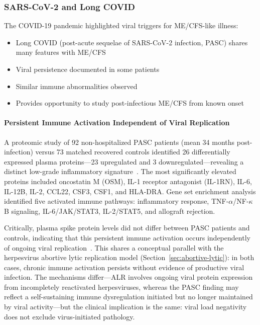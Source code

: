 \subsubsection{SARS-CoV-2 and Long COVID}

The COVID-19 pandemic highlighted viral triggers for ME/CFS-like illness:
\begin{itemize}
    \item Long COVID (post-acute sequelae of SARS-CoV-2 infection, PASC) shares many features with ME/CFS
    \item Viral persistence documented in some patients
    \item Similar immune abnormalities observed
    \item Provides opportunity to study post-infectious ME/CFS from known onset
\end{itemize}

\paragraph{Persistent Immune Activation Independent of Viral Replication}
A proteomic study of 92 non-hospitalized PASC patients (mean 34 months post-infection) versus 73 matched recovered controls identified 26 differentially expressed plasma proteins---23 upregulated and 3 downregulated---revealing a distinct low-grade inflammatory signature~\cite{Fineschi2026pasc_proteomics}. The most significantly elevated proteins included oncostatin M (OSM), IL-1 receptor antagonist (IL-1RN), IL-6, IL-12B, IL-2, CCL22, CSF3, CSF1, and HLA-DRA. Gene set enrichment analysis identified five activated immune pathways: inflammatory response, TNF-$\alpha$/NF-$\kappa$B signaling, IL-6/JAK/STAT3, IL-2/STAT5, and allograft rejection.

Critically, plasma spike protein levels did not differ between PASC patients and controls, indicating that this persistent immune activation occurs independently of ongoing viral replication~\cite{Fineschi2026pasc_proteomics}. This shares a conceptual parallel with the herpesvirus abortive lytic replication model (Section~\ref{sec:abortive-lytic}): in both cases, chronic immune activation persists without evidence of productive viral infection. The mechanisms differ---ALR involves ongoing viral protein expression from incompletely reactivated herpesviruses, whereas the PASC finding may reflect a self-sustaining immune dysregulation initiated but no longer maintained by viral activity---but the clinical implication is the same: viral load negativity does not exclude virus-initiated pathology.

